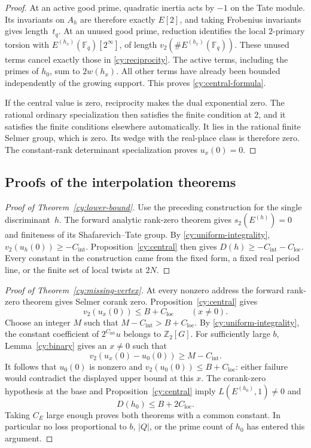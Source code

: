 \begin{proof}
At an active good prime, quadratic inertia acts by $-1$ on the Tate
module.  Its invariants on $A_h$ are therefore exactly $E[2]$, and taking
Frobenius invariants gives length~$t_q$.  At an unused good prime, reduction
identifies the local $2$-primary torsion with
$E^{(h_x)}(\mathbb F _q)[2^\infty]$, of length
$v_2(\#E^{(h_x)}(\mathbb F _q))$.  These unused terms cancel exactly
those in \eqref{cy:reciprocity}.  The active terms, including the primes
of $h_0$, sum to $2w(h_x)$.  All other terms have already been bounded
independently of the growing support.  This proves
\eqref{cy:central-formula}.

If the central value is zero, reciprocity makes the dual exponential
zero.  The rational ordinary specialization then satisfies the finite
condition at $2$, and it satisfies the finite conditions elsewhere
automatically.  It lies in the rational finite Selmer group, which is
zero.  Its wedge with the real-place class is therefore zero.  The
constant-rank determinant specialization proves $u_x(0)=0$.
\end{proof}

\subsection{Proofs of the interpolation theorems}

\begin{proof}[Proof of Theorem~\ref{cy:lower-bound}]
Use the preceding construction for the single discriminant~$h$.
The forward analytic rank-zero theorem gives $s_2(E^{(h)})=0$ and
finiteness of its Shafarevich--Tate group.  By
\eqref{cy:uniform-integrality}, $v_2(u_h(0))\geq-C_{\mathrm{int}}$.
Proposition~\ref{cy:central} then gives
$D(h)\geq-C_{\mathrm{int}}-C_{\mathrm{loc}}$.  Every constant in the
construction came from the fixed form, a fixed real period line, or
the finite set of local twists at $2N$.
\end{proof}

\begin{proof}[Proof of Theorem~\ref{cy:missing-vertex}]
At every nonzero address the forward rank-zero theorem gives Selmer
corank zero.  Proposition~\ref{cy:central} gives
\[
 v_2(u_x(0))\leq B+C_{\mathrm{loc}}\qquad(x\ne0).
\]
Choose an integer $M$ such that
$M-C_{\mathrm{int}}>B+C_{\mathrm{loc}}$.  By
\eqref{cy:uniform-integrality}, the constant coefficient of
$2^{C_{\mathrm{int}}}u$ belongs to $\mathbb Z _2[G]$.  For sufficiently
large $b$, Lemma~\ref{cy:binary} gives an $x\ne0$ such that
\[
 v_2(u_x(0)-u_0(0))\geq M-C_{\mathrm{int}}.
\]
It follows that $u_0(0)$ is nonzero and
$v_2(u_0(0))\leq B+C_{\mathrm{loc}}$: either failure would contradict
the displayed upper bound at this $x$.  The corank-zero hypothesis
at the base and Proposition~\ref{cy:central} imply
$L(E^{(h_0)},1)\ne0$ and
\[
 D(h_0)\leq B+2C_{\mathrm{loc}}.
\]
Taking $C_E$ large enough proves both theorems with a common constant.
In particular no loss proportional to $b$, $|Q|$, or the prime count of
$h_0$ has entered this argument.
\end{proof}
